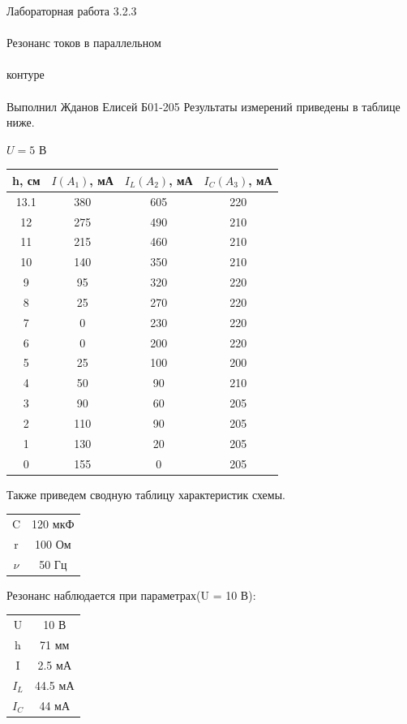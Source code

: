 \documentclass{astroedu-lab}
\begin{document}
\begin{problem}{\huge Лабораторная работа 3.2.3\\\\Резонанс токов в параллельном\\\\контуре\\\\Выполнил Жданов Елисей Б01-205}
Результаты измерений приведены в таблице ниже.

\begin{center}
	\Large $U = 5 \text{ В}$
\end{center}

\begin{center}
\begin{tabular}{|c|c|c|c|}
\hline 
h, см & $I(A_1)$, мА & $I_L(A_2)$, мА & $I_C(A_3)$, мА \\
\hline
13.1 & 380 & 605 & 220 \\
12   & 275 & 490 & 210 \\
11   & 215 & 460 & 210 \\
10   & 140 & 350 & 210 \\
9	 & 95  & 320 & 220 \\
8	 & 25  & 270 & 220 \\
7	 & 0   & 230 & 220 \\
6	 & 0   & 200 & 220 \\
5	 & 25  & 100 & 200 \\
4	 & 50  & 90  & 210 \\
3	 & 90  & 60  & 205 \\
2	 & 110 & 90  & 205 \\
1	 & 130 & 20  & 205 \\
0	 & 155 & 0   & 205 \\

\hline
\end{tabular}
\end{center}

Также приведем сводную таблицу характеристик схемы.

\begin{center}
\begin{tabular}{|c|c|}
\hline 
C &		120 мкФ	\\
r & 	100	Ом	\\
$\nu$ & 50  Гц	\\
\hline
\end{tabular}
\end{center}

Резонанс наблюдается при параметрах(U = 10 В):

\begin{center}
\begin{tabular}{|c|c|}
\hline 
U & 10		 В  \\
h & 71		 мм \\
I & 2.5		 мА \\
$I_L$ & 44.5 мА \\
$I_C$ & 44   мА \\
\hline
\end{tabular}
\end{center}


\end{problem}
\end{document}
